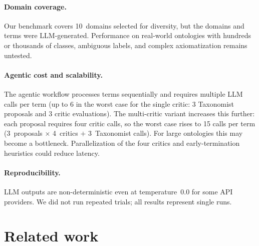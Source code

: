 \documentclass{IOS-Book-Article}
\begin{document}
\paragraph{Domain coverage.}
Our benchmark covers 10~domains selected for diversity, but the
domains and terms were LLM-generated.  Performance on real-world
ontologies with hundreds or thousands of classes, ambiguous labels, and
complex axiomatization remains untested.

\paragraph{Agentic cost and scalability.}
The agentic workflow processes terms sequentially and requires multiple
LLM calls per term (up to 6 in the worst case for the single critic: 3
Taxonomist proposals and 3 critic evaluations).  The multi-critic
variant increases this further: each proposal requires four critic
calls, so the worst case rises to 15 calls per term (3~proposals
$\times$ 4~critics $+$ 3~Taxonomist calls).  For large ontologies this
may become a bottleneck.  Parallelization of the four critics and
early-termination heuristics could reduce
latency.

\paragraph{Reproducibility.}
LLM outputs are non-deterministic even at temperature~0.0 for some
API providers.  We did not run repeated trials; all results represent
single runs.

\section{Related work}

\end{document}
